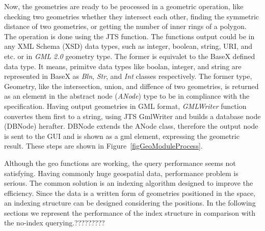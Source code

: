 \documentclass[a4paper,12pt]{article}
\begin{document}
Now, the geometries are ready to be processed in a geometric operation, like checking two geometries whether they intersect each other, finding the symmetric distance of two geometries, or getting the number of inner rings of a polygon. The operation is done using the JTS function. The functions output could be in any XML Schema (XSD) data types, such as integer, boolean, string, URI, and etc. or in \textit{GML 2.0} geometry type. The former is equivalet to the BaseX defined data type. It means, primitve data types like boolan, integer, and string are represented in BaseX as \textit{Bln}, \textit{Str}, and \textit{Int} classes respectively. The former type, Geometry, like the intersection, union, and diffence of two geometries, is returned as an element in the abstract node (\textit{ANode}) type to be in compliance with the specification. Having output geometries in GML format, \textit{GMLWriter} function convertes them first to a string, using JTS GmlWriter and builds a database node (DBNode) herafter. DBNode extends the ANode class, therefore the output node is sent to the GUI and is shown as a gml element, expressing the geometric result. These steps are shown in Figure~\ref{figGeoModuleProcess}.

Although the geo functions are working, the query performance seems not satisfying. Having commonly huge geospatial data, performance problem is serious. The common solution is an indexing algorithm designed to improve the efficiency. Since the data is a written form of geometries positioned in the space, an indexing structure can be designed considering the positions. In the following sections we represent the performance of the index structure in comparison with the no-index querying.?????????
\end{document}
